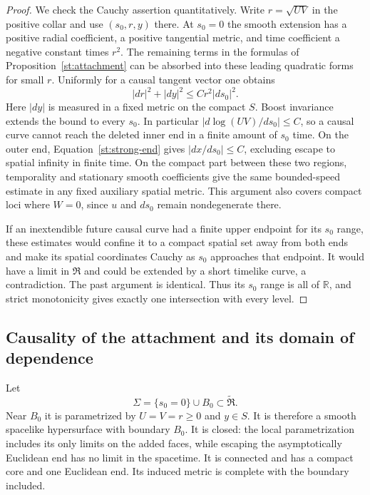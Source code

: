 \begin{proof}
We check the Cauchy assertion quantitatively.  Write
$r=\sqrt{UV}$ in the positive collar and use $(s_0,r,y)$ there.
At $s_0=0$ the smooth extension has a positive radial coefficient,
a positive tangential metric, and time coefficient a negative
constant times $r^2$.  The remaining terms in the formulas of
Proposition~\ref{st:attachment} can be absorbed into these leading
quadratic forms for small $r$.  Uniformly for a causal tangent
vector one obtains
\begin{equation}\label{st:collar-cone}
 |dr|^2+|dy|^2\leq C r^2|ds_0|^2.
\end{equation}
Here $|dy|$ is measured in a fixed metric on the compact $S$.
Boost invariance extends the bound to every $s_0$.  In particular
$|d\log(UV)/ds_0|\leq C$, so a causal curve cannot reach the
deleted inner end in a finite amount of $s_0$ time.  On the outer
end, Equation~\eqref{st:strong-end} gives
$|dx/ds_0|\leq C$, excluding escape to spatial infinity in finite
time.  On the compact part between these two regions, temporality
and stationary smooth coefficients give the same bounded-speed
estimate in any fixed auxiliary spatial metric.  This argument
also covers compact loci where $W=0$, since $u$ and $ds_0$ remain
nondegenerate there.

If an inextendible future causal curve had a finite upper endpoint
for its $s_0$ range, these estimates would confine it to a compact
spatial set away from both ends and make its spatial coordinates
Cauchy as $s_0$ approaches that endpoint.  It would have a limit
in $\mathfrak R$ and could be extended by a short timelike curve,
a contradiction.  The past argument is identical.  Thus its
$s_0$ range is all of $\mathbb R$, and strict monotonicity gives
exactly one intersection with every level.
\end{proof}

\subsection{Causality of the attachment and its domain of dependence}

Let
\begin{equation}\label{st:sigma-definition}
 \Sigma=\{s_0=0\}\cup B_0\subset\widetilde{\mathfrak R}.
\end{equation}
Near $B_0$ it is parametrized by $U=V=r\geq0$ and $y\in S$.
It is therefore a smooth spacelike hypersurface with boundary $B_0$.
It is closed: the local parametrization includes its only limits on
the added faces, while escaping the asymptotically Euclidean end
has no limit in the spacetime.  It is connected and has a compact
core and one Euclidean end.  Its induced metric is complete with
the boundary included.

